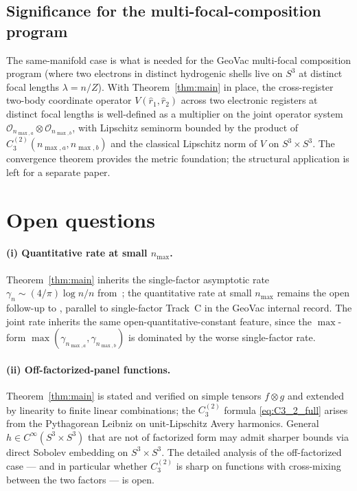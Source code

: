 \documentclass[11pt,a4paper]{article}
\theoremstyle{plain}
\theoremstyle{definition}
\newcommand{\nmax}{n_{\max}}
\newcommand{\nmaxa}{n_{\max,a}}
\newcommand{\nmaxb}{n_{\max,b}}
\newcommand{\sthree}{S^{3}}
\newcommand{\Op}{\mathcal{O}}
\begin{document}
\subsection{Significance for the multi-focal-composition program}
\label{sec:significance}

The same-manifold case is what is needed for the GeoVac multi-focal
composition program (where two electrons in distinct hydrogenic shells
live on $\sthree$ at distinct focal lengths $\lambda = n/Z$). With
Theorem~\ref{thm:main} in place, the cross-register two-body coordinate
operator $V(\hat r_1, \hat r_2)$ across two electronic registers at
distinct focal lengths is well-defined as a multiplier on the joint
operator system $\Op_{\nmaxa} \otimes \Op_{\nmaxb}$, with
Lipschitz seminorm bounded by the product of $C_3^{(2)}(\nmaxa,
\nmaxb)$ and the classical Lipschitz norm of $V$ on $\sthree \times
\sthree$. The convergence theorem provides the metric foundation; the
structural application is left for a separate paper.

\section{Open questions}\label{sec:open}

\paragraph{(i) Quantitative rate at small $\nmax$.} Theorem~\ref{thm:main}
inherits the single-factor asymptotic rate
$\gamma_n \sim (4/\pi) \log n / n$ from~\cite{loutey_paper38}; the
quantitative rate at small $\nmax$ remains the open follow-up to
\cite[\S 5(i)]{loutey_paper38}, parallel to single-factor Track~C in
the GeoVac internal record. The joint rate inherits the same
open-quantitative-constant feature, since the $\max$-form
$\max(\gamma_{\nmaxa}, \gamma_{\nmaxb})$ is dominated by the worse
single-factor rate.

\paragraph{(ii) Off-factorized-panel functions.} Theorem~\ref{thm:main}
is stated and verified on simple tensors $f \otimes g$ and extended by
linearity to finite linear combinations; the $C_3^{(2)}$ formula
\eqref{eq:C3_2_full} arises from the Pythagorean Leibniz on
unit-Lipschitz Avery harmonics. General $h \in C^\infty(\sthree
\times \sthree)$ that are not of factorized form may admit
sharper bounds via direct Sobolev embedding on $\sthree \times
\sthree$. The detailed analysis of the off-factorized case --- and in
particular whether $C_3^{(2)}$ is sharp on functions with cross-mixing
between the two factors --- is open.
\end{document}
